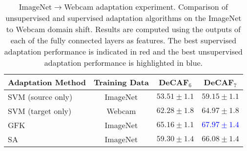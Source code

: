 \begin{table*}[t]
\centering
\begin{tabular}{lccc}
\toprule
Adaptation Method & Training Data & DeCAF$_6$ & DeCAF$_7$ \\
\midrule
SVM (source only) & ImageNet & $53.51 \pm 1.1$ & $59.15 \pm 1.1$ \\
SVM (target only) & Webcam & $62.28 \pm 1.8$ & $64.97 \pm 1.8$ \\
\midrule
GFK \cite{gong-cvpr12} & ImageNet & $65.16 \pm 1.1$ & \textcolor{blue}{$\bm{67.97 \pm 1.4 }$}\\
SA \cite{sa} & ImageNet & $59.30 \pm 1.4$ & $66.08 \pm 1.4$ \\
\bottomrule
\end{tabular}
\caption{ImageNet$\rightarrow$Webcam adaptation experiment. Comparison of unsupervised and supervised adaptation algorithms on the ImageNet to Webcam domain shift. Results are computed using the outputs of each of the fully connected layers as features. The best supervised adaptation performance is indicated in red and the best unsupervised adaptation performance is highlighted in blue.}
\label{tab:fc6and7_imagenet_unsup}
\end{table*}

